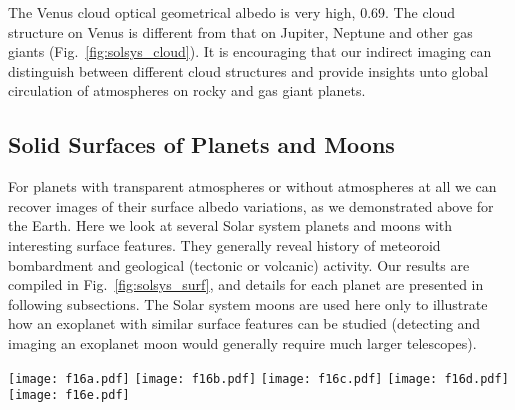 \documentclass{emulateapj}
\begin{document}
The Venus cloud optical geometrical albedo is very high, 0.69. 
The cloud structure on Venus is different from that on Jupiter, Neptune and other gas giants (Fig.~\ref{fig:solsys_cloud}).
It is encouraging that our indirect imaging can distinguish between different cloud
structures and provide insights unto global circulation of atmospheres on rocky and
gas giant planets.


\subsection{Solid Surfaces of Planets and Moons}\label{sec:inve_solsys_surf}

For planets with transparent atmospheres or without atmospheres at all we can
recover images of their surface albedo variations, as we demonstrated above for the Earth.
Here we look at several Solar system planets and moons with interesting surface features.
They generally reveal history of meteoroid bombardment and geological (tectonic or volcanic)
activity. Our results are compiled in Fig.~\ref{fig:solsys_surf}, and details for each
planet are presented in following subsections. The Solar system moons are used here only
to illustrate how an exoplanet with similar surface features can be studied
(detecting and imaging an exoplanet moon would generally require much larger telescopes).

\begin{figure*}
\centering
\texttt{[image: f16a.pdf]}
\texttt{[image: f16b.pdf]}
\texttt{[image: f16c.pdf]}
\texttt{[image: f16d.pdf]}
\texttt{[image: f16e.pdf]}
\caption{Albedo maps for surfaces of some Solar system planets and moons. 
In the first column, are original RGB maps of higher resolution,
in the second column are original maps rebinned to the $6^\circ\times6^\circ$ grid in a particular band,
and in the third column are recovered maps in the same band. 
The assumed geometrical parameter values are  
$i_{\rm r}=60^\circ$, $i_{\rm o}=30^\circ$, and $\zeta_{\rm o}=30^\circ$.
The original rebinned maps are used to simulate the "observed" light curve from
which recovered images are obtained using inversions.
}
\label{fig:solsys_surf}
\end{figure*}
\end{document}
